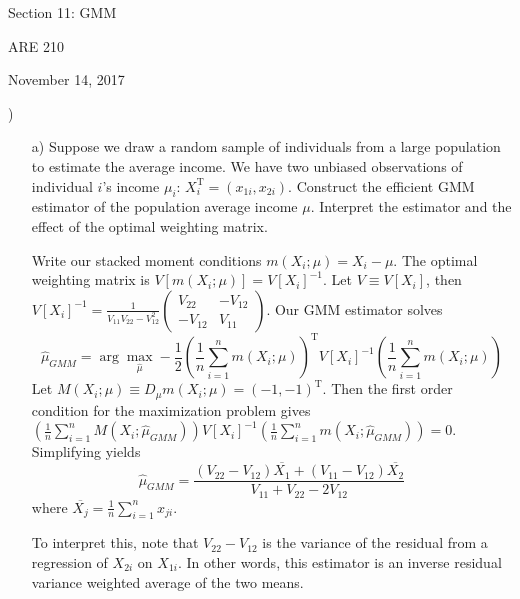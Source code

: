 \documentclass[12pt,english]{article}
\newcommand{\T}{\ensuremath{\text{T}}}
\begin{document}
\begin{center}
{\Large{}Section 11: GMM}
\par\end{center}{\Large \par}

\begin{center}
ARE 210
\par\end{center}

\begin{center}
November 14, 2017
\par\end{center}

)
\begin{enumerate}
	\item[a)] Suppose we draw a random sample of individuals from a large population to estimate the average income. We have two unbiased observations of individual $i$'s income $\mu_{i}$: $X_{i}^{\T} = (x_{1i}, x_{2i})$. Construct the efficient GMM estimator of the population average income $\mu$. Interpret the estimator and the effect of the optimal weighting matrix.
	\vspace{1em}
	
	Write our stacked moment conditions $m(X_{i}; \mu) = X_{i} - \mu$. The optimal weighting matrix is $V[m(X_{i}; \mu)] = V[X_{i}]^{-1}$. Let $V \equiv V[X_{i}]$, then \\ $\displaystyle V[X_{i}]^{-1} = \frac{1}{V_{11} V_{22} - V_{12}^{2}} \left( \begin{array}{cc} V_{22} & -V_{12} \\ -V_{12} & V_{11} \end{array} \right)$. Our GMM estimator solves
	$$ \hat{\mu}_{GMM} = \arg \max_{\hat{\mu}} -\frac{1}{2} \left( \frac{1}{n} \sum_{i=1}^{n} m(X_{i}; \mu) \right)^{\T} V[X_{i}]^{-1} \left( \frac{1}{n} \sum_{i=1}^{n} m(X_{i}; \mu) \right) $$
	Let $M(X_{i}; \mu) \equiv D_{\mu} m(X_{i}; \mu) = (-1, -1)^{\T}$. Then the first order condition for the maximization problem gives $\left( \frac{1}{n} \sum_{i=1}^{n} M(X_{i}; \hat{\mu}_{GMM}) \right) V[X_{i}]^{-1} \left( \frac{1}{n} \sum_{i=1}^{n} m(X_{i}; \hat{\mu}_{GMM}) \right) = 0$. Simplifying yields
	$$ \hat{\mu}_{GMM} = \frac{(V_{22} - V_{12}) \overline{X_{1}} + (V_{11} - V_{12}) \overline{X_{2}}}{V_{11} + V_{22} - 2 V_{12}}$$
	where $\overline{X_{j}} = \frac{1}{n} \sum_{i=1}^{n} x_{ji}$.
	
	To interpret this, note that $V_{22} - V_{12}$ is the variance of the residual from a regression of $X_{2i}$ on $X_{1i}$. In other words, this estimator is an inverse residual variance weighted average of the two means.
	

\end{enumerate}
\end{document}
